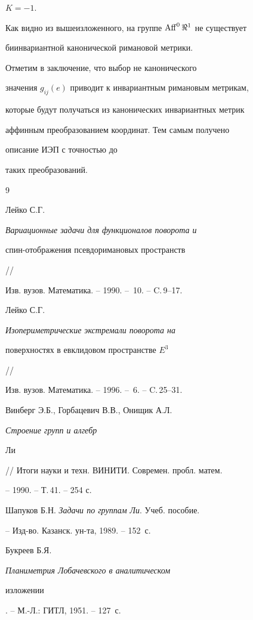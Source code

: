 $K=-1$.


Как видно из вышеизложенного, на группе $\operatorname{Aff}^0\Re^1$ не существует 


биинвариантной канонической римановой метрики. 


 


Отметим в заключение, что выбор не канонического 


значения $g_{i j}(e)$ приводит к инвариантным римановым метрикам, 


которые будут получаться из канонических инвариантных метрик 


аффинным преобразованием координат. Тем самым получено 


описание ИЭП с точностью до 


таких преобразований. 


 


\begin{thebibliography}{9} 


 




Лейко С.Г. {\em Вариационные задачи для функционалов поворота и 


спин-отображения псевдоримановых пространств} // 


Изв. вузов. Математика. -- 1990. -- \No\,10. -- C.\,9--17. 




Лейко С.Г. {\em Изопериметрические экстремали поворота на 


поверхностях в евклидовом пространстве $E^3$} // 


Изв. вузов. Математика. -- 1996. -- \No\,6. -- C.\,25--31. 




Винберг Э.Б., Горбацевич В.В., Онищик А.Л. {\em Строение групп и алгебр 


Ли} // Итоги науки и техн. ВИНИТИ. Современ. пробл. матем. 


-- 1990. -- Т.\,41. -- 254 с. 




Шапуков Б.Н. {\em Задачи по группам Ли}. Учеб. пособие. 


-- Изд-во. Казанск. ун-та, 1989. -- 152~с. 




Букреев Б.Я. {\em Планиметрия Лобачевского в аналитическом 


изложении}. -- М.-Л.: ГИТЛ, 1951. -- 127~с. 


 


\end{thebibliography} 


 


\vskip 2cm 


 






 


\label{end} 


 


 


